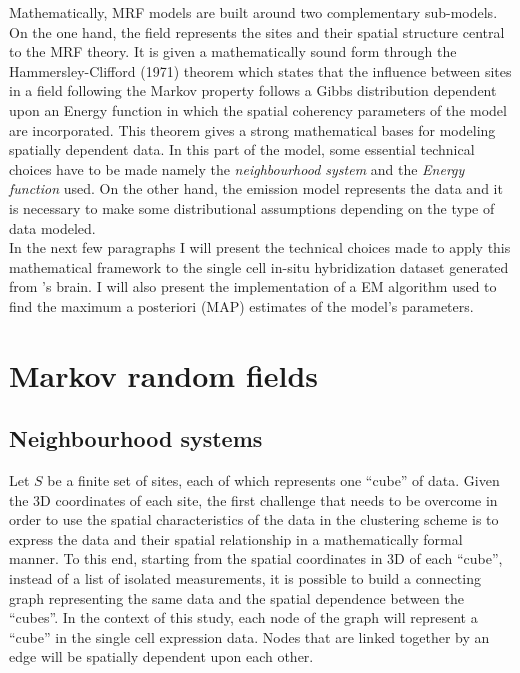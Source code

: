 	 Mathematically, MRF models are built around two complementary sub-models. On the one hand, the field represents the sites and their spatial structure central to the MRF theory. It is given a mathematically sound form through the Hammersley-Clifford (1971) theorem which states that the influence between sites in a field following the Markov property follows a Gibbs distribution dependent upon an Energy function in which the spatial coherency parameters of the model are incorporated. This theorem gives a strong mathematical bases for modeling spatially dependent data. In this part of the model, some essential technical choices have to be made namely the \emph{neighbourhood system} and the \emph{Energy function} used. On the other hand, the emission model represents the data and it is necessary to make some distributional assumptions depending on the type of data modeled.\\
	 
	 In the next few paragraphs I will present the technical choices made to apply this mathematical framework to the single cell in-situ hybridization dataset generated from \platy{}'s brain. I will also present the implementation of a EM algorithm used to find the maximum a posteriori (MAP) estimates of the model's parameters.

\section{Markov random fields}
	

	\subsection{Neighbourhood systems}\label{sec:neighbours}
Let $S$ be a finite set of sites, each of which represents one ``cube'' of data. Given the 3D coordinates of each site, the first challenge that needs to be overcome in order to use the spatial characteristics of the data in the clustering scheme is to express the data and their spatial relationship in a mathematically formal manner. To this end, starting from the spatial coordinates in 3D of each ``cube'', instead of a list of isolated measurements, it is possible to build a connecting graph representing the same data and the spatial dependence between the ``cubes''. In the context of this study, each node of the graph will represent a ``cube'' in the single cell expression data. Nodes that are linked together by an edge will be spatially dependent upon each other.\\


